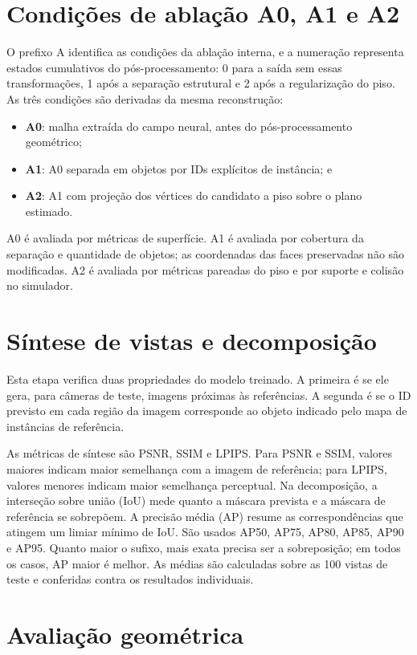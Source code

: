 \section{Condições de ablação A0, A1 e A2}

O prefixo A identifica as condições da ablação interna, e a numeração representa estados cumulativos do pós-processamento: 0 para a saída sem essas transformações, 1 após a separação estrutural e 2 após a regularização do piso. As três condições são derivadas da mesma reconstrução:
\begin{itemize}
  \item \textbf{A0}: malha extraída do campo neural, antes do pós-processamento geométrico;
  \item \textbf{A1}: A0 separada em objetos por IDs explícitos de instância; e
  \item \textbf{A2}: A1 com projeção dos vértices do candidato a piso sobre o plano estimado.
\end{itemize}

A0 é avaliada por métricas de superfície. A1 é avaliada por cobertura da separação e quantidade de objetos; as coordenadas das faces preservadas não são modificadas. A2 é avaliada por métricas pareadas do piso e por suporte e colisão no simulador.

\section{Síntese de vistas e decomposição}

Esta etapa verifica duas propriedades do modelo treinado. A primeira é se ele gera, para câmeras de teste, imagens próximas às referências. A segunda é se o ID previsto em cada região da imagem corresponde ao objeto indicado pelo mapa de instâncias de referência.

As métricas de síntese são PSNR, SSIM e LPIPS. Para PSNR e SSIM, valores maiores indicam maior semelhança com a imagem de referência; para LPIPS, valores menores indicam maior semelhança perceptual. Na decomposição, a interseção sobre união (IoU) mede quanto a máscara prevista e a máscara de referência se sobrepõem. A precisão média (AP) resume as correspondências que atingem um limiar mínimo de IoU. São usados AP50, AP75, AP80, AP85, AP90 e AP95. Quanto maior o sufixo, mais exata precisa ser a sobreposição; em todos os casos, AP maior é melhor. As médias são calculadas sobre as 100 vistas de teste e conferidas contra os resultados individuais.

\section{Avaliação geométrica}

